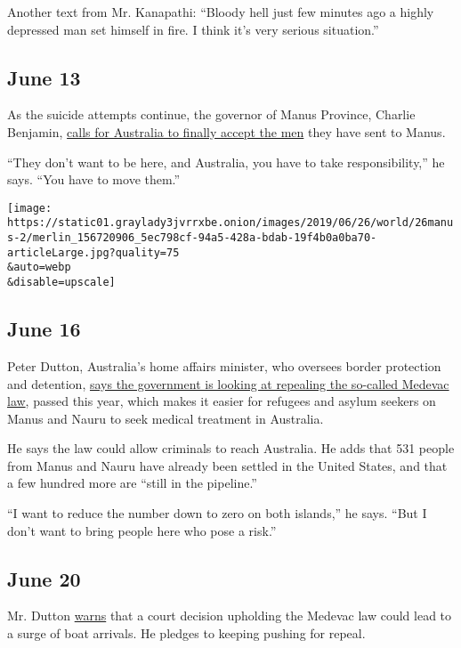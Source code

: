 Another text from Mr. Kanapathi: ``Bloody hell just few minutes ago a
highly depressed man set himself in fire. I think it's very serious
situation.''

\hypertarget{june-13}{%
\subsection{June 13}\label{june-13}}

As the suicide attempts continue, the governor of Manus Province,
Charlie Benjamin,
\href{https://www.abc.net.au/news/2019-06-13/manus--self-harm-crisis-escalates-as-governor-calls-for-help/11199258}{calls
for Australia to finally accept the men} they have sent to Manus.

``They don't want to be here, and Australia, you have to take
responsibility,'' he says. ``You have to move them.''

\texttt{[image: https://static01.graylady3jvrrxbe.onion/images/2019/06/26/world/26manus-2/merlin\_156720906\_5ec798cf-94a5-428a-bdab-19f4b0a0ba70-articleLarge.jpg?quality=75\\\&auto=webp\\\&disable=upscale]}

\hypertarget{june-16}{%
\subsection{June 16}\label{june-16}}

Peter Dutton, Australia's home affairs minister, who oversees border
protection and detention,
\href{https://www.abc.net.au/news/2019-06-16/peter-dutton-unsure-medevac-arrivals-refugees-serious-offences/11214584}{says
the government is looking at repealing the so-called Medevac law},
passed this year, which makes it easier for refugees and asylum seekers
on Manus and Nauru to seek medical treatment in Australia.

He says the law could allow criminals to reach Australia. He adds that
531 people from Manus and Nauru have already been settled in the United
States, and that a few hundred more are ``still in the pipeline.''

``I want to reduce the number down to zero on both islands,'' he says.
``But I don't want to bring people here who pose a risk.''

\hypertarget{june-20}{%
\subsection{June 20}\label{june-20}}

Mr. Dutton
\href{https://www.abc.net.au/news/2019-06-20/warnings-of-boat-arrivals/11226254}{warns}
that a court decision upholding the Medevac law could lead to a surge of
boat arrivals. He pledges to keeping pushing for repeal.

